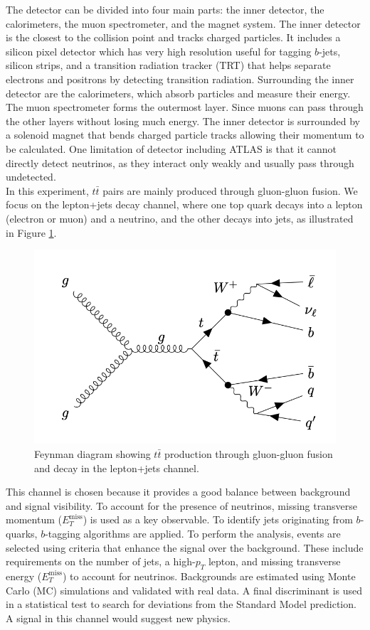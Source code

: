 The detector can be divided into four main parts: the inner detector, the calorimeters, the muon spectrometer, and the magnet system. The inner detector is the closest to the collision point and tracks charged particles. It includes a silicon pixel detector which has very high resolution useful for tagging \( b \)-jets, silicon strips, and a transition radiation tracker (TRT) that helps separate electrons and positrons by detecting transition radiation. Surrounding the inner detector are the calorimeters, which absorb particles and measure their energy.
\\

The muon spectrometer forms the outermost layer. Since muons can pass through the other layers without losing much energy. The inner detector is surrounded by a solenoid magnet that bends charged particle tracks allowing their momentum to be calculated. One limitation of detector including ATLAS is that it cannot directly detect neutrinos, as they interact only weakly and usually pass through undetected.
\\

In this experiment, \( t\bar{t} \) pairs are mainly produced through gluon-gluon fusion. We focus on the lepton+jets decay channel, where one top quark decays into a lepton (electron or muon) and a neutrino, and the other decays into jets, as illustrated in Figure \ref{tt-decay}.

\begin{figure}[H]
    \centering
    \includegraphics[width=0.5\linewidth]{Figure/tt-decay.png}
    \caption{Feynman diagram showing \( t\bar{t} \) production through gluon-gluon fusion and decay in the lepton+jets channel.}
    \label{tt-decay}
\end{figure}

This channel is chosen because it provides a good balance between background and signal visibility. To account for the presence of neutrinos, missing transverse momentum (\( E_T^{\text{miss}} \)) is used as a key observable. To identify jets originating from \( b \)-quarks, \( b \)-tagging algorithms are applied. To perform the analysis, events are selected using criteria that enhance the signal over the background. These include requirements on the number of jets, a high-\( p_T \) lepton, and missing transverse energy (\( E_T^{\text{miss}} \)) to account for neutrinos. Backgrounds are estimated using Monte Carlo (MC) simulations and validated with real data. A final discriminant is used in a statistical test to search for deviations from the Standard Model prediction. A signal in this channel would suggest new physics.



